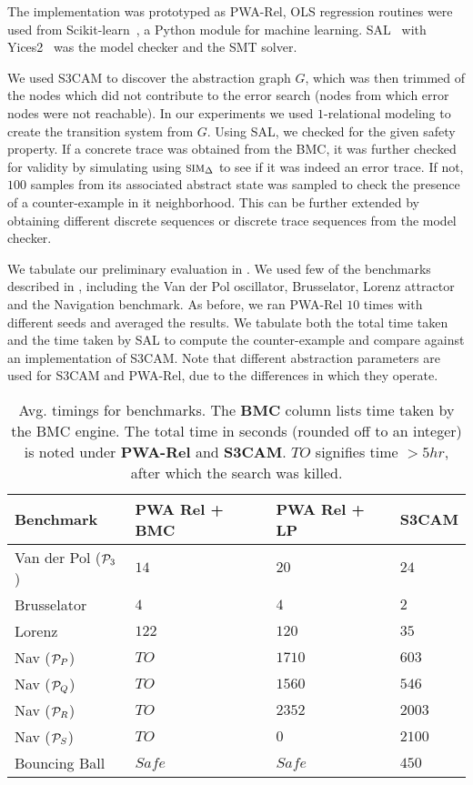 
The implementation was prototyped as PWA-Rel,
OLS regression
routines were used from Scikit-learn~\cite{pedregosa2011scikit}, a
Python module for machine learning. SAL~\cite{SAL-SRI}
with Yices2~\cite{dutertre2014yices} was the model checker and the SMT
solver.

We used S3CAM to discover the abstraction graph $G$, which was then
trimmed of the nodes which did not contribute to the error search
(nodes from which error nodes were not reachable). In our experiments we
used $1$-relational modeling to create the transition system from $G$.
Using SAL, we checked for the given safety property. If a concrete
trace was obtained from the BMC, it was further checked for validity
by simulating using $\mbox{\sc sim}_\Delta$ to see if it was indeed an error
trace.  If not, $100$ samples from its associated abstract state was
sampled to check the presence of a counter-example in it
neighborhood. This can be further extended by obtaining different
discrete sequences or discrete trace sequences from the model checker.

We tabulate our preliminary evaluation in . We used
few of the benchmarks described in \cite{zutshi2014multiple},
including the Van der Pol oscillator, Brusselator, Lorenz attractor
and the Navigation benchmark. As before, we ran PWA-Rel $10$ times
with different seeds and averaged the results. We tabulate both the
total time taken and the time taken by SAL to compute the
counter-example and compare against an implementation of S3CAM. Note
that different abstraction parameters are used for S3CAM and
PWA-Rel, due to the differences in which they operate.

\begin{table}[!htbp]
\centering
\caption{Avg. timings for benchmarks. The \textbf{BMC} column lists
time taken by the BMC engine. The total time in seconds (rounded off
to an integer) is noted under \textbf{PWA-Rel} and \textbf{S3CAM}.
$TO$ signifies time $>5hr$, after which the search was killed.}
\label{tab:res-rel}
\begin{tabular}{@{}llll@{}}
\toprule
    Benchmark & PWA Rel + BMC & PWA Rel + LP & S3CAM\\
\midrule
    Van der Pol ($\mathcal{P}_3$)   &$14$ & $20$ & $24$\\
    Brusselator               &$4$ & $4$ & $2$\\
    Lorenz                    &$122$ & $120$ & $35$\\
    Nav ($\mathcal{P}_P$)           &$TO$ & $1710$  & $603$ \\%
    Nav ($\mathcal{P}_Q$)           &$TO$ & $1560$   & $546$ \\%
    Nav ($\mathcal{P}_R$)           &$TO$ & $2352$  & $2003$\\
    Nav ($\mathcal{P}_S$)           &$TO$ & $0$  & $2100$\\
    Bouncing Ball             &$Safe$ & $Safe$  & $450$\\

\bottomrule
\end{tabular}
\end{table}

